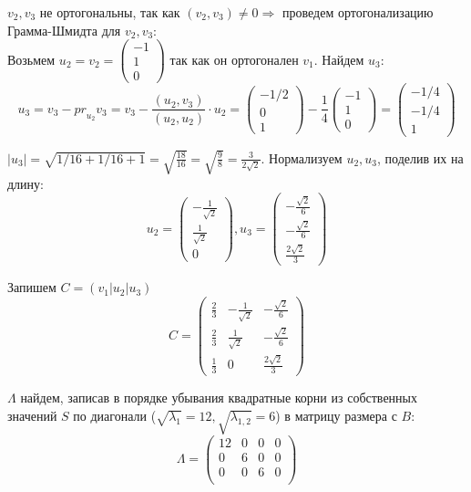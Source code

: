 \documentclass[a4paper,12pt]{article}
\begin{document}
\begin{enumerate}
$v_2, v_3$ не ортогональны, так как $(v_2, v_3)\neq0 \Rightarrow$ проведем ортогонализацию Грамма-Шмидта для $v_2, v_3$:\\
Возьмем $u_2 = v_2 = \begin{pmatrix}
-1\\
1\\
0
\end{pmatrix}$ так как он ортогонален $v_1$. Найдем $u_3$:
$$u_3=v_3-{pr}_{u_2}v_3=v_3-\frac{(u_2,v_3)}{(u_2,u_2)}\cdot u_2=\begin{pmatrix}
-1/2\\
0\\
1
\end{pmatrix}-\frac{1}{4} \begin{pmatrix}
-1\\
1\\
0
\end{pmatrix}=\begin{pmatrix}
-1/4\\
-1/4\\
1
\end{pmatrix}$$

$|u_3|=\sqrt{1/16+1/16+1}=\sqrt{\frac{18}{16}}=\sqrt{\frac{9}{8}}=\frac{3}{2\sqrt{2}}$. Нормализуем $u_2, u_3$, поделив их на длину: 
$$u_2 = \begin{pmatrix}
-\frac{1}{\sqrt{2}}\\
\frac{1}{\sqrt{2}}\\
0
\end{pmatrix}, u_3 = \begin{pmatrix}
-\frac{\sqrt{2}}{6}\\
-\frac{\sqrt{2}}{6}\\
\frac{2\sqrt{2}}{3}
\end{pmatrix}$$

Запишем $C=(v_1|u_2|u_3)$
$$C = \begin{pmatrix}
\frac{2}{3}&-\frac{1}{\sqrt{2}}&-\frac{\sqrt{2}}{6}\\
\frac{2}{3}&\frac{1}{\sqrt{2}}&-\frac{\sqrt{2}}{6}\\
\frac{1}{3}&0&\frac{2\sqrt{2}}{3}
\end{pmatrix} $$


$\Lambda$ найдем, записав в порядке убывания квадратные корни из собственных значений $S$ по диагонали ($\sqrt{\lambda_1}=12, \sqrt{\lambda_{1,2}} = 6$) в матрицу размера с $B$: 
$$\Lambda=\begin{pmatrix}
12&0&0&0\\
0&6&0&0\\
0&0&6&0\\
\end{pmatrix}$$


\end{enumerate}
\end{document}
